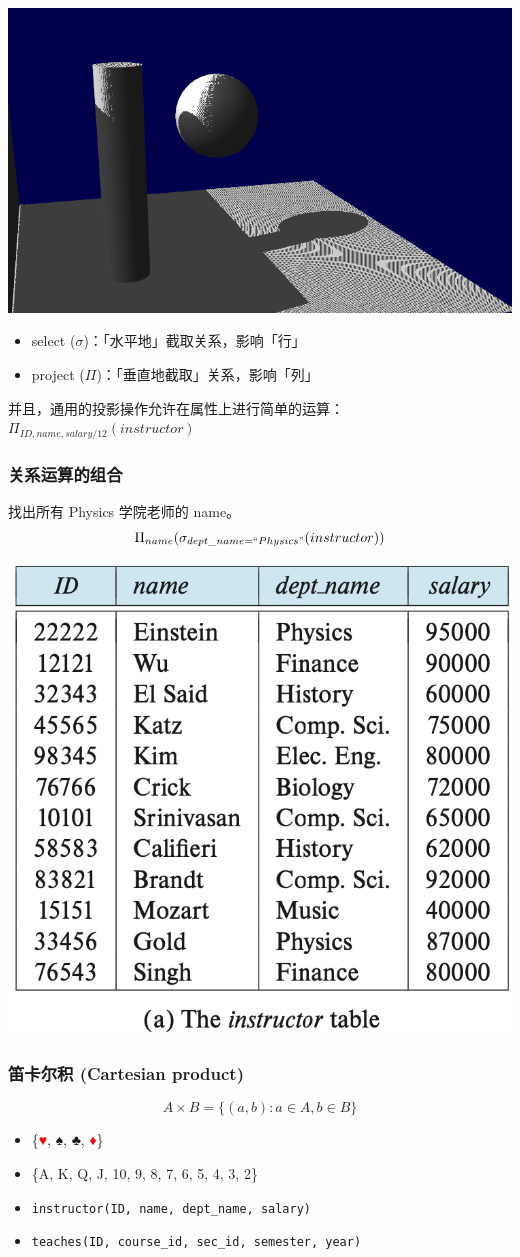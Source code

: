 \documentclass[aspectratio=169, 14pt]{beamer}
\begin{document}
\begin{frame}
    \begin{center}
        \includegraphics[width=.45\textwidth]{image/project}
    \end{center}

\begin{itemize}
    \item select ($\sigma$)：「水平地」截取关系，影响「行」
    \item project ($\Pi$)：「垂直地截取」关系，影响「列」
\end{itemize}
\pause
并且，通用的投影操作允许在属性上进行简单的运算：\large{\(\Pi_{ID, name, salary/12}(instructor)\)}
    
\end{frame}

\begin{frame}
    \frametitle{关系运算的组合}
    找出所有 Physics 学院老师的 name。
    {\large \[\Pi_{name}(\sigma_{dept\_name=``Physics"}(instructor))\]}
    \begin{center}
        \includegraphics[width=.55\textwidth, trim={0 4.4cm 0 0},clip]{table/instructor} 
    \end{center}

\end{frame}

\begin{frame}
    \frametitle{笛卡尔积 (Cartesian product)}
\[A \times B = \{(a, b): a \in A, b \in B\}\]
\pause
\begin{itemize}
    \item \{{\textcolor{red}{\suitfont♥︎}}, {\suitfont♠︎}, {\suitfont♣︎}, {\textcolor{red}{\suitfont♦}}︎\}
    \item \{A, K, Q, J, 10, 9, 8, 7, 6, 5, 4, 3, 2\}
\end{itemize}
\pause
\begin{itemize}
    \item \texttt{instructor(ID, name, dept\_name, salary)}
    \item \texttt{teaches(ID, course\_id, sec\_id, semester, year)}
   \end{itemize} 
\end{frame}
\end{document}
